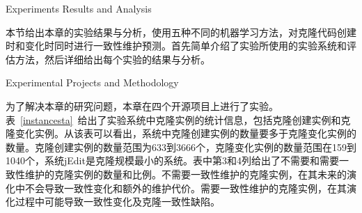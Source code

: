 {Experiments Results and Analysis}

本节给出本章的实验结果与分析，使用五种不同的机器学习方法，对克隆代码创建时和变化时同时进行一致性维护预测。首先简单介绍了实验所使用的实验系统和评估方法，然后详细给出每个实验的结果与分析。


{Experimental Projects and Methodology}

为了解决本章的研究问题，本章在四个开源项目上进行了实验。表~\ref{instancesta}~给出了实验系统中克隆实例的统计信息，包括克隆创建实例和克隆变化实例。从该表可以看出，系统中克隆创建实例的数量要多于克隆变化实例的数量。克隆创建实例的数量范围为633到3666个，克隆变化实例的数量范围在159到1040个，系统jEdit是克隆规模最小的系统。表中第3和4列给出了不需要和需要一致性维护的克隆实例的数量和比例。不需要一致性维护的克隆实例，在其未来的演化中不会导致一致性变化和额外的维护代价。需要一致性维护的克隆实例，在其演化过程中可能导致一致性变化及克隆一致性缺陷。




